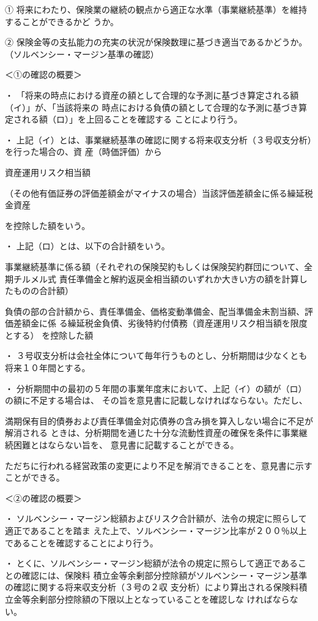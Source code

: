 \documentclass[report,gutter=10mm,fore-edge=10mm,uplatex,dvipdfmx]{jlreq}
\begin{document}
① 将来にわたり、保険業の継続の観点から適正な水準（事業継続基準）を維持することができるかど
うか。

② 保険金等の支払能力の充実の状況が保険数理に基づき適当であるかどうか。
（ソルベンシー・マージン基準の確認）

＜①の確認の概要＞

・ 「将来の時点における資産の額として合理的な予測に基づき算定される額（イ）」が、「当該将来の
時点における負債の額として合理的な予測に基づき算定される額（ロ）」を上回ることを確認する
ことにより行う。

・ 上記（イ）とは、事業継続基準の確認に関する将来収支分析（３号収支分析）を行った場合の、資
産（時価評価）から

資産運用リスク相当額

（その他有価証券の評価差額金がマイナスの場合）当該評価差額金に係る繰延税金資産

を控除した額をいう。

・ 上記（ロ）とは、以下の合計額をいう。

事業継続基準に係る額（それぞれの保険契約もしくは保険契約群団について、全期チルメル式
責任準備金と解約返戻金相当額のいずれか大きい方の額を計算したものの合計額）

負債の部の合計額から、責任準備金、価格変動準備金、配当準備金未割当額、評価差額金に係
る繰延税金負債、劣後特約付債務（資産運用リスク相当額を限度とする） を控除した額

・ ３号収支分析は会社全体について毎年行うものとし、分析期間は少なくとも将来１０年間とする。

・ 分析期間中の最初の５年間の事業年度末において、上記（イ）の額が（ロ）の額に不足する場合は、
その旨を意見書に記載しなければならない。ただし、


満期保有目的債券および責任準備金対応債券の含み損を算入しない場合に不足が解消される
ときは、分析期間を通じた十分な流動性資産の確保を条件に事業継続困難とはならない旨を、
意見書に記載することができる。


ただちに行われる経営政策の変更により不足を解消できることを、意見書に示すことができる。

＜②の確認の概要＞

・ ソルベンシー・マージン総額およびリスク合計額が、法令の規定に照らして適正であることを踏ま
えた上で、ソルベンシー・マージン比率が２００％以上であることを確認することにより行う。

・ とくに、ソルベンシー・マージン総額が法令の規定に照らして適正であることの確認には、保険料
積立金等余剰部分控除額がソルベンシー・マージン基準の確認に関する将来収支分析（３号の２収
支分析）により算出される保険料積立金等余剰部分控除額の下限以上となっていることを確認しな
ければならない。
\end{document}
